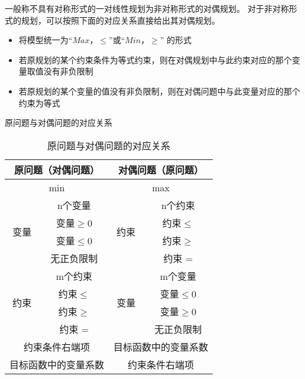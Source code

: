 \documentclass{book}
\begin{document}
\begin{enumerate}
          一般称不具有对称形式的一对线性规划为非对称形式的对偶规划。
          对于非对称形式的规划，可以按照下面的对应关系直接给出其对偶规划。
          \begin{itemize}
              \item 将模型统一为“$Max，\le$”或“$Min，\ge$” 的形式
              \item 若原规划的某个约束条件为等式约束，则在对偶规划中与此约束对应的那个变量取值没有非负限制
              \item 若原规划的某个变量的值没有非负限制，则在对偶问题中与此变量对应的那个约束为等式
          \end{itemize}
\end{enumerate}

原问题与对偶问题的对应关系

\begin{table}[ht]
    \centering
    \begin{tabular}{cc|cc}
        \hline
        \multicolumn{2}{c|}{原问题（对偶问题）}  & \multicolumn{2}{c}{对偶问题（原问题）}                                   \\
        \hline
        \multicolumn{2}{c|}{min}        & \multicolumn{2}{c}{max}                                         \\
        \hline
        \multirow{4}{*}{变量}             & n个变量                           & \multirow{4}{*}{约束} & n个约束     \\
                                        & 变量$\ge$0                       &                     & 约束$\le$  \\
                                        & 变量$\le$0                       &                     & 约束$\ge$  \\
                                        & 无正负限制                          &                     & 约束 =     \\
        \hline
        \multirow{4}{*}{约束}             & m个约束                           & \multirow{4}{*}{变量} & m个变量     \\
                                        & 约束$\le$                        &                     & 变量$\le$0 \\
                                        & 约束$\ge$                        &                     & 变量$\ge$0 \\
                                        & 约束 =                           &                     & 无正负限制    \\
        \hline
        \multicolumn{2}{c|}{约束条件右端项}    & \multicolumn{2}{c}{目标函数中的变量系数}                                  \\
        \multicolumn{2}{c|}{目标函数中的变量系数} & \multicolumn{2}{c}{约束条件右端项}                                     \\
        \hline
    \end{tabular}
    \caption{原问题与对偶问题的对应关系}
    \label{tab:corresponding relationship between problem
        P and the problem D}
\end{table}
\end{document}
